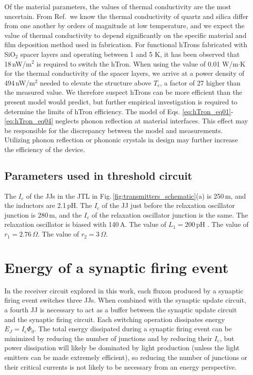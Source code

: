 \documentclass[twocolumn]{article}
\newcommand{\onlinecite}[1]{\hspace{-1 ex} \nocite{#1}\citenum{#1}}
\begin{document}
Of the material parameters, the values of thermal conductivity are the most uncertain. From Ref.\,\onlinecite{zepo1971} we know the thermal conductivity of quartz and silica differ from one another by orders of magnitude at low temperature, and we expect the value of thermal conductivity to depend significantly on the specific material and film deposition method used in fabrication. For functional hTrons fabricated with SiO$_2$ spacer layers and operating between 1 and 5 K, it has been observed \cite{mc2018} that 18\,nW/\textmu m$^2$ is required to switch the hTron. When using the value of 0.01 W/m$\cdot$K for the thermal conductivity of the spacer layers, we arrive at a power density of 494\,nW/\textmu m$^2$ needed to elevate the structure above $T_{\mathrm{c}}$, a factor of 27 higher than the measured value. We therefore suspect hTrons can be more efficient than the present model would predict, but further empirical investigation is required to determine the limits of hTron efficiency. The model of Eqs. \ref{eq:hTron_eq01}-\ref{eq:hTron_eq04} neglects phonon reflection at material interfaces. This effect may be responsible for the discrepancy between the model and measurements. Utilizing phonon reflection or phononic crystals in design may further increase the efficiency of the device.

\subsection{Parameters used in threshold circuit}
The $I_c$ of the JJs in the JTL in Fig.\,\ref{fig:transmitters_schematic}(a) is 250\,\textmu m, and the inductors are 2.1\,pH. The $I_c$ of the JJ just before the relaxation oscillator junction is 280\,\textmu m, and the $I_c$ of the relaxation oscillator junction is the same. The relaxation oscillator is biased with 140\,\textmu A. The value of $L_1 = 200$\,pH . The value of $r_1 = 2.76$\,$\Omega$. The value of $r_2 = 3$\,$\Omega$.

\section{\label{sec:appendix_energy}Energy of a synaptic firing event}
In the receiver circuit explored in this work, each fluxon produced by a synaptic firing event switches three JJs. When combined with the synaptic update circuit, a fourth JJ is necessary to act as a buffer between the synaptic update circuit and the synaptic firing circuit. Each switching operation dissipates energy $E_{J} = I_{\mathrm{c}} \Phi_{0}$. The total energy dissipated during a synaptic firing event can be minimized by reducing the number of junctions and by reducing their $I_{\mathrm{c}}$, but power dissipation will likely be dominated by light production (unless the light emitters can be made extremely efficient), so reducing the number of junctions or their critical currents is not likely to be necessary from an energy perspective. 
\end{document}
